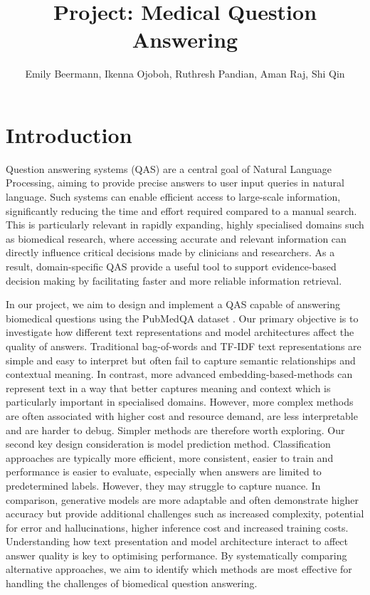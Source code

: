 \documentclass[11pt]{article}
\title{Project: Medical Question Answering}
\author{Emily Beermann, Ikenna Ojoboh, Ruthresh Pandian, Aman Raj, Shi Qin}
\begin{document}
\maketitle
\begin{abstract}
\end{abstract}


\section{Introduction}
Question answering systems (QAS) are a central goal of Natural Language Processing, aiming to provide precise answers to user input queries in natural language. Such systems can enable efficient access to large-scale information, significantly reducing the time and effort required compared to a manual search. This is particularly relevant in rapidly expanding, highly specialised domains such as biomedical research, where accessing accurate and relevant information can directly influence critical decisions made by clinicians and researchers. As a result, domain-specific QAS provide a useful tool to support evidence-based decision making by facilitating faster and more reliable information retrieval. \par
In our project, we aim to design and implement a QAS capable of answering biomedical questions using the PubMedQA dataset \cite{jin_pubmedqa_2019}. Our primary objective is to investigate how different text representations and model architectures affect the quality of answers. Traditional bag-of-words and TF-IDF text representations are simple and easy to interpret but often fail to capture semantic relationships and contextual meaning. In contrast, more advanced embedding-based-methods can represent text in a way that better captures meaning and context which is particularly important in specialised domains. However, more complex methods are often associated with higher cost and resource demand, are less interpretable and are harder to debug. Simpler methods are therefore worth exploring. Our second key design consideration is model prediction method. Classification approaches are typically more efficient, more consistent, easier to train and performance is easier to evaluate, especially when answers are limited to predetermined labels. However, they may struggle to capture nuance. In comparison, generative models are more adaptable and often demonstrate higher accuracy but provide additional challenges such as increased complexity, potential for error and hallucinations, higher inference cost and increased training costs.  Understanding how text presentation and model architecture interact to affect answer quality is key to optimising performance. By systematically comparing alternative approaches, we aim to identify which methods are most effective for handling the challenges of biomedical question answering. \par
\end{document}
